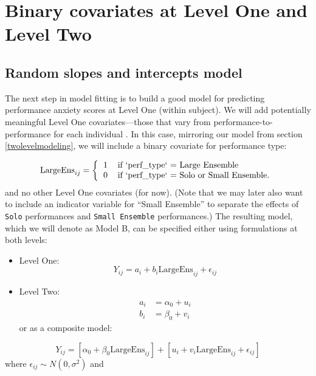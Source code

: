 \documentclass[
]{krantz}
\providecommand{\tightlist}{%
  \setlength{\itemsep}{0pt}\setlength{\parskip}{0pt}}
\begin{document}
\hypertarget{modelb}{%
\section{Binary covariates at Level One and Level Two}\label{modelb}}

\hypertarget{randomslopeandint}{%
\subsection{Random slopes and intercepts model}\label{randomslopeandint}}

The next step in model fitting is to build a good model for predicting performance anxiety scores at Level One (within subject). We will add potentially meaningful Level One covariates---those that vary from performance-to-performance for each individual . In this case, mirroring our model from section \ref{twolevelmodeling}, we will include a binary covariate for performance type:

\[ \textrm{LargeEns}_{ij} =
\left\lbrace
\begin{tabular}{l l} 
1 & if `perf\_type` = Large Ensemble \\
0 & if `perf\_type` = Solo or Small Ensemble. 
\end{tabular}\right.
\]
and no other Level One covariates (for now). (Note that we may later also want to include an indicator variable for ``Small Ensemble'' to separate the effects of \texttt{Solo} performances and \texttt{Small\ Ensemble} performances.) The resulting model, which we will denote as Model B, can be specified either using formulations at both levels:

\begin{itemize}
\tightlist
\item
  Level One:
  \begin{equation*}
  Y_{ij} = a_{i}+b_{i}\textrm{LargeEns}_{ij}+\epsilon_{ij}
  \end{equation*}
\item
  Level Two:
  \begin{align*}
  a_{i} & = \alpha_{0}+u_{i} \\
  b_{i} & = \beta_{0}+v_{i}
  \end{align*}
  or as a composite model:
\end{itemize}

\begin{equation*}
Y_{ij}=[\alpha_{0}+\beta_{0}\textrm{LargeEns}_{ij}]+[u_{i}+v_{i}\textrm{LargeEns}_{ij}+\epsilon_{ij}]
\end{equation*}
where \(\epsilon_{ij}\sim N(0,\sigma^2)\) and
\end{document}
